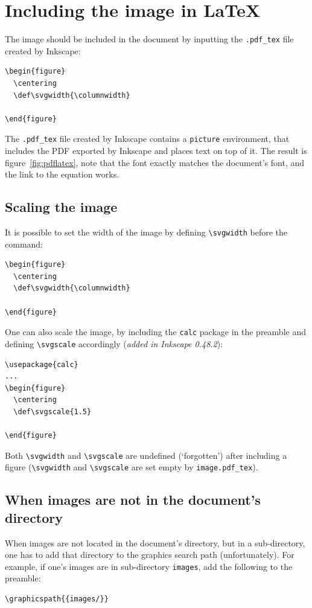 \documentclass[final,3p,twocolumn]{elsarticle}
\begin{document}
\section{Including the image in \LaTeX}

The image should be included in the document by inputting the {\small\verb|.pdf_tex|} file created by Inkscape: 
\begin{verbatim}
\begin{figure} 
  \centering
  \def\svgwidth{\columnwidth}
  
\end{figure}
\end{verbatim}

The {\small\verb|.pdf_tex|} file created by Inkscape contains a {\small\verb|picture|} environment, that includes the PDF exported by Inkscape and places text on top of it. The result is figure~\ref{fig:pdflatex}, note that the font exactly matches the document's font, and the link to the equation works. 

\subsection{Scaling the image}
It is possible to set the width of the image by defining {\small\verb|\svgwidth|} before the {\small\verb||} command:
\begin{verbatim}
\begin{figure} 
  \centering
  \def\svgwidth{\columnwidth}
  
\end{figure}
\end{verbatim}

One can also scale the image, by including the {\small\verb|calc|} package in the preamble and defining {\small\verb|\svgscale|} accordingly (\emph{added in Inkscape 0.48.2}):
\begin{verbatim}
\usepackage{calc}
...
\begin{figure} 
  \centering
  \def\svgscale{1.5}
  
\end{figure}
\end{verbatim}

Both {\small\verb|\svgwidth|} and {\small\verb|\svgscale|} are undefined (`forgotten') after including a figure ({\small\verb|\svgwidth|} and {\small\verb|\svgscale|} are set empty by {\small\verb|image.pdf_tex|}).

\subsection{When images are not in the document's directory}
When images are not located in the document's directory, but in a sub-directory, one has to add that directory to the graphics search path (unfortunately). For example, if one's images are in sub-directory {\small\verb|images|}, add the following to the preamble:
\begin{verbatim}
\graphicspath{{images/}}
\end{verbatim}
\end{document}
